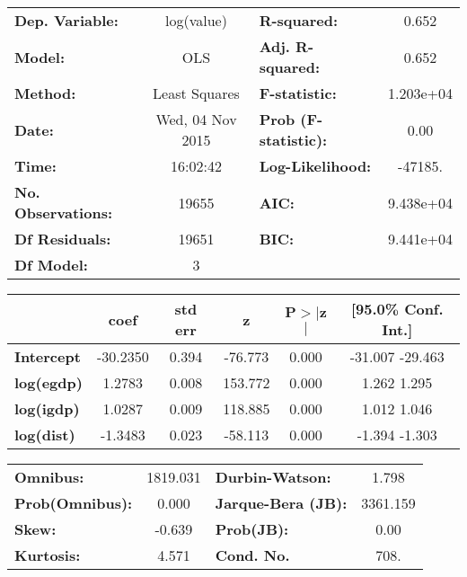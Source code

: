\begin{center}
\begin{tabular}{lclc}
\toprule
\textbf{Dep. Variable:}    &    log(value)    & \textbf{  R-squared:         } &     0.652   \\
\textbf{Model:}            &       OLS        & \textbf{  Adj. R-squared:    } &     0.652   \\
\textbf{Method:}           &  Least Squares   & \textbf{  F-statistic:       } & 1.203e+04   \\
\textbf{Date:}             & Wed, 04 Nov 2015 & \textbf{  Prob (F-statistic):} &     0.00    \\
\textbf{Time:}             &     16:02:42     & \textbf{  Log-Likelihood:    } &   -47185.   \\
\textbf{No. Observations:} &       19655      & \textbf{  AIC:               } & 9.438e+04   \\
\textbf{Df Residuals:}     &       19651      & \textbf{  BIC:               } & 9.441e+04   \\
\textbf{Df Model:}         &           3      & \textbf{                     } &             \\
\bottomrule
\end{tabular}
\begin{tabular}{lccccc}
                   & \textbf{coef} & \textbf{std err} & \textbf{z} & \textbf{P$>$$|$z$|$} & \textbf{[95.0\% Conf. Int.]}  \\
\midrule
\textbf{Intercept} &     -30.2350  &        0.394     &   -76.773  &         0.000        &       -31.007   -29.463       \\
\textbf{log(egdp)} &       1.2783  &        0.008     &   153.772  &         0.000        &         1.262     1.295       \\
\textbf{log(igdp)} &       1.0287  &        0.009     &   118.885  &         0.000        &         1.012     1.046       \\
\textbf{log(dist)} &      -1.3483  &        0.023     &   -58.113  &         0.000        &        -1.394    -1.303       \\
\bottomrule
\end{tabular}
\begin{tabular}{lclc}
\textbf{Omnibus:}       & 1819.031 & \textbf{  Durbin-Watson:     } &    1.798  \\
\textbf{Prob(Omnibus):} &   0.000  & \textbf{  Jarque-Bera (JB):  } & 3361.159  \\
\textbf{Skew:}          &  -0.639  & \textbf{  Prob(JB):          } &     0.00  \\
\textbf{Kurtosis:}      &   4.571  & \textbf{  Cond. No.          } &     708.  \\
\bottomrule
\end{tabular}
\end{center}